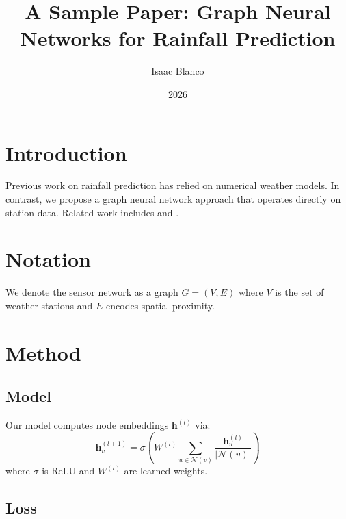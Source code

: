 \documentclass{article}
\title{A Sample Paper: Graph Neural Networks for Rainfall Prediction}
\author{Isaac Blanco}
\date{2026}
\newenvironment{tcprocess}[1]{}{}
\newenvironment{implement}[1]{}{}
\newcommand{\tcsymbol}[3]{}
\begin{document}
\maketitle

\section{Introduction}

Previous work on rainfall prediction has relied on numerical weather models.
In contrast, we propose a graph neural network approach that operates directly
on station data. Related work includes \cite{smith2022} and \cite{jones2021}.

\section{Notation}

\begin{tcprocess}{def:graph}
  We denote the sensor network as a graph $G = (V, E)$ where $V$ is the set
  of weather stations and $E$ encodes spatial proximity.
  \tcsymbol{G}{graph}{Graph, nodes=|V|}
\end{tcprocess}

\section{Method}

\subsection{Model}

\begin{implement}{model:gnn}
  Our model computes node embeddings $\mathbf{h}^{(l)}$ via:
  \begin{equation}\label{eq:gnn}
    \mathbf{h}^{(l+1)}_v = \sigma\!\left(
      W^{(l)} \sum_{u \in \mathcal{N}(v)} \frac{\mathbf{h}^{(l)}_u}{|\mathcal{N}(v)|}
    \right)
  \end{equation}
  where $\sigma$ is ReLU and $W^{(l)}$ are learned weights.
\end{implement}

\subsection{Loss}
\end{document}
